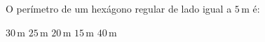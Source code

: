 O perímetro de um hexágono regular de lado igual a $5$\,m é:

$30$\,m
$25$\,m
$20$\,m
$15$\,m
$40$\,m



